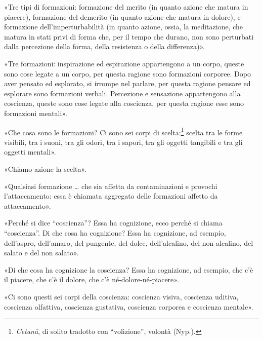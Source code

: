 
«Tre tipi di formazioni: formazione del merito (in quanto azione che matura in
piacere), formazione del demerito (in quanto azione che matura in dolore), e
formazione dell’imperturbabilità (in quanto azione, ossia, la meditazione, che
matura in stati privi di forma che, per il tempo che durano, non sono perturbati
dalla percezione della forma, della resistenza o della differenza)».


«Tre formazioni: inspirazione ed espirazione appartengono a un corpo, queste
sono cose legate a un corpo, per questa ragione sono formazioni corporee. Dopo
aver pensato ed esplorato, si irrompe nel parlare, per questa ragione pensare ed
esplorare sono formazioni verbali. Percezione e sensazione appartengono alla
coscienza, queste sono cose legate alla coscienza, per questa ragione esse sono
formazioni mentali».


«Che cosa sono le formazioni? Ci sono sei corpi di
scelta:\footnote{\emph{Cetanā}, di solito tradotto con “volizione”, volontà
  (Nyp.).} scelta tra le forme visibili, tra i suoni, tra gli odori, tra i
sapori, tra gli oggetti tangibili e tra gli oggetti mentali».


«Chiamo azione la scelta».


«Qualsiasi formazione … che sia affetta da contaminazioni e provochi
l’attaccamento: essa è chiamata aggregato delle formazioni affetto da
attaccamento».


«Perché si dice “coscienza”? Essa ha cognizione, ecco perché si chiama
“coscienza”. Di che cosa ha cognizione? Essa ha cognizione, ad esempio,
dell’aspro, dell’amaro, del pungente, del dolce, dell’alcalino, del non
alcalino, del salato e del non salato».


«Di che cosa ha cognizione la coscienza? Essa ha cognizione, ad esempio, che c’è
il piacere, che c’è il dolore, che c’è né-dolore-né-piacere».


«Ci sono questi sei corpi della coscienza: coscienza visiva, coscienza uditiva,
coscienza olfattiva, coscienza gustativa, coscienza corporea e coscienza
mentale».

